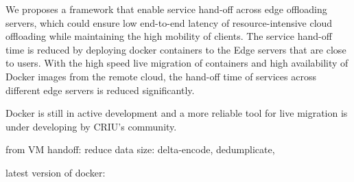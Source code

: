 We proposes a framework that enable service hand-off across edge offloading servers, which could ensure low end-to-end latency of resource-intensive cloud offloading while maintaining the high mobility of clients. The service hand-off time is reduced by deploying docker containers to the Edge servers that are close to users. With the high speed live migration of containers and high availability of Docker images from the remote cloud, the hand-off time of services across different edge servers is reduced significantly.

Docker is still in active development and a more reliable tool for live migration is under developing by CRIU's community.

from VM handoff: reduce data size: delta-encode, dedumplicate,


latest version of docker:

